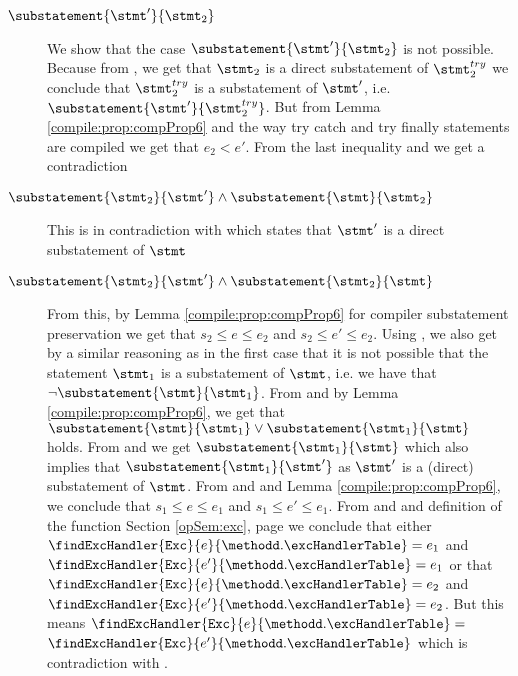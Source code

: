 \begin{description}
  \item[$ \substatement{\stmt'}{\stmt_2}  $] 
       We show that the case $\substatement{\stmt'}{\stmt_2}$ is not possible. 
       Because from , we get that  $ \stmt_2$ is a direct substatement of $\stmt^{try}_2$ we conclude that
       $\stmt^{try}_2 $ is a substatement of $\stmt'$, i.e.    $\substatement{\stmt'}{ \stmt^{try}_2  }$.
       But from Lemma \ref{compile:prop:compProp6} and the way try catch  and try finally statements are compiled
       we get that $e_2 <  e'$. From the last inequality and  we get  a contradiction
       
  \item[$\substatement{\stmt_2} {\stmt'} \wedge \substatement{\stmt}{\stmt_2}    $] 
       This is in contradiction with   which states that $\stmt'$ is a direct substatement 
       of  $\stmt$

  \item[$ \substatement{\stmt_2} {\stmt'} \wedge \substatement{\stmt_2}{\stmt}  $] 
       From this, by Lemma \ref{compile:prop:compProp6} for compiler substatement preservation  we get that
           $s_2 \le e \le e_2$ and $s_2 \le e' \le e_2 $.
       Using , we also get by a similar reasoning as in the first case that 
       it is not possible that the statement $\stmt_1$ is a substatement of $\stmt$, i.e. we have that
        $\neg \substatement{\stmt}{\stmt_1}$. From  and  by Lemma 
       \ref{compile:prop:compProp6}, we get that    $ \substatement{\stmt}{\stmt_1} \vee \substatement{\stmt_1}{\stmt} $ holds.
       From   and   we get   $ \substatement{\stmt_1}{\stmt}$ which also implies that 
        $ \substatement{\stmt_1}{\stmt'}$ as $\stmt'$ is a (direct) substatement of $\stmt$. 
       From    and  and  Lemma \ref{compile:prop:compProp6}, we conclude that   
           $s_1 \le e \le e_1$ and $s_1 \le e' \le e_1$. From   and  and 
       definition of the function \findExcHandlerOnly{}  Section \ref{opSem:exc}, page \pageref{opSem:exc} we conclude that either
       $\findExcHandler{\mbox{\rm\tt{Exc}} }{e}{\methodd.\excHandlerTable} =  e_1 $ and 
        $\findExcHandler{\mbox{\rm\tt{Exc}} }{e'}{\methodd.\excHandlerTable} =  e_1 $
	or that \\
         $\findExcHandler{\mbox{\rm\tt{Exc}} }{e}{\methodd.\excHandlerTable} =  e_2 $ and 
        $\findExcHandler{\mbox{\rm\tt{Exc}} }{e'}{\methodd.\excHandlerTable} =  e_2 $. But this means 
	 $\findExcHandler{\mbox{\rm\tt{Exc}} }{e}{\methodd.\excHandlerTable} = $ $\findExcHandler{\mbox{\rm\tt{Exc}} }{e'}{\methodd.\excHandlerTable}$
	 which is contradiction with .
	
 
      
\end{description}



